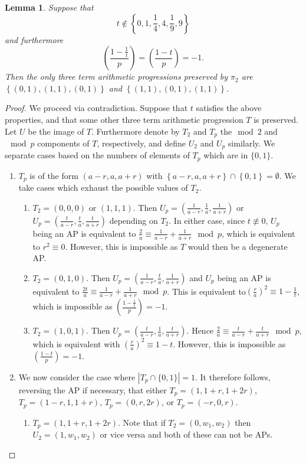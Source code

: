 \documentclass[12pt]{amsart}
\newtheorem{lemma}[thm]{Lemma}
\theoremstyle{definition}
\theoremstyle{remark}
\begin{document}
\begin{lemma}\label{Lemma2pPartA} 
Suppose that
\[t\not\in \left\{0,1,\frac{1}{4},4,\frac{1}{9},9\right\} \]
and furthermore
\[(\frac{1-\frac{1}{t}}{p})=(\frac{1-t}{p})=-1.\]
Then the only three term arithmetic progressions preserved by $\pi_2$ are $\left\{(0, 1), (1,1), (0, 1)\right\} $ and $\left\{(1, 1), (0, 1), (1, 1)\right\}$.
\end{lemma}
\begin{proof}
We proceed via contradiction. Suppose that $t$ satisfies the above properties, and that some other three term arithmetic progression $T$ is preserved. Let $U$ be the image of $T$. Furthermore denote by $T_2$ and $T_p$ the$\mod 2$ and$\mod p$ components of $T$, respectively, and define $U_2$ and $U_p$ similarly. We separate cases based on the numbers of elements of $T_p$ which are in $\{0,1\}$.
\begin{enumerate}
\item$T_p$ is of the form $(a-r, a, a+r)$ with $\left\{a-r, a, a+r\right\}\cap \left\{0, 1\right\}=\emptyset$. We take cases which exhaust the possible values of $T_2$.
 \begin{enumerate}
 \item $T_2=(0, 0, 0)$ or $(1,1,1)$. Then $U_p=(\frac{1}{a-r}, \frac{1}{a}, \frac{1}{a+r})$ or $U_p=(\frac{t}{a-r}, \frac{t}{a}, \frac{t}{a+r})$ depending on $T_2$. In either case, since $t\nequiv 0$, $U_p$ being an AP is equivalent to $\frac{2}{a}\equiv \frac{1}{a-r}+\frac{1}{a+r}\mod p$, which is equivalent to $r^2\equiv 0$. However, this is impossible as $T$ would then be a degenerate AP.
 \item $T_2=(0, 1, 0).$ Then $U_p=(\frac{1}{a-r}, \frac{t}{a}, \frac{1}{a+r})$ and $U_p$ being an AP is equivalent to $\frac{2t}{a}\equiv \frac{1}{a-r}+\frac{1}{a+r}\mod p$. This is equivalent to$(\frac{r}{a})^2\equiv 1-\frac{1}{t}$, which is impossible as $(\frac{1-\frac{1}{t}}{p})=-1$.
\item $T_2=(1, 0, 1).$ Then $U_p=(\frac{t}{a-r}, \frac{1}{a}, \frac{t}{a+r})$. Hence $\frac{2}{a}\equiv \frac{t}{a-r}+\frac{t}{a+r}\mod p$, which is equivalent with $(\frac{r}{a})^2\equiv1-t$. However, this is impossible as $(\frac{1-t}{p})=-1$.
 \end{enumerate}
\item We now consider the case where $|T_p\cap \{0,1\}|=1$. It therefore follows, reversing the AP if necessary, that either $T_p=(1,1+r,1+2r)$, $T_p=(1-r,1,1+r)$, $T_p=(0,r,2r)$, or $T_p=(-r,0,r)$. 
\begin{enumerate}
\item $T_p=(1,1+r,1+2r).$ Note that if $T_2=(0,w_1,w_2)$ then $U_2=(1,w_1,w_2)$ or vice versa and both of these can not be APs.


\end{enumerate}
\end{enumerate}
\end{proof}
\end{document}
